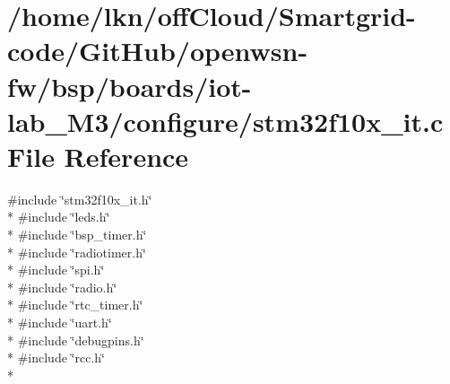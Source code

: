 \hypertarget{iot-lab___m3_2configure_2stm32f10x__it_8c}{}\section{/home/lkn/off\+Cloud/\+Smartgrid-\/code/\+Git\+Hub/openwsn-\/fw/bsp/boards/iot-\/lab\+\_\+\+M3/configure/stm32f10x\+\_\+it.c File Reference}
\label{iot-lab___m3_2configure_2stm32f10x__it_8c}
{\ttfamily \#include \char`\"{}stm32f10x\+\_\+it.\+h\char`\"{}}\\*
{\ttfamily \#include \char`\"{}leds.\+h\char`\"{}}\\*
{\ttfamily \#include \char`\"{}bsp\+\_\+timer.\+h\char`\"{}}\\*
{\ttfamily \#include \char`\"{}radiotimer.\+h\char`\"{}}\\*
{\ttfamily \#include \char`\"{}spi.\+h\char`\"{}}\\*
{\ttfamily \#include \char`\"{}radio.\+h\char`\"{}}\\*
{\ttfamily \#include \char`\"{}rtc\+\_\+timer.\+h\char`\"{}}\\*
{\ttfamily \#include \char`\"{}uart.\+h\char`\"{}}\\*
{\ttfamily \#include \char`\"{}debugpins.\+h\char`\"{}}\\*
{\ttfamily \#include \char`\"{}rcc.\+h\char`\"{}}\\*
